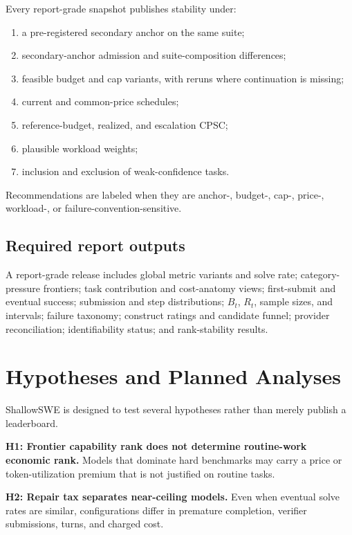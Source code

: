 \documentclass[11pt]{article}
\begin{document}
Every report-grade snapshot publishes stability under:

\begin{enumerate}
\item{} a pre-registered secondary anchor on the same suite;
\item{} secondary-anchor admission and suite-composition differences;
\item{} feasible budget and cap variants, with reruns where continuation is missing;
\item{} current and common-price schedules;
\item{} reference-budget, realized, and escalation CPSC;
\item{} plausible workload weights;
\item{} inclusion and exclusion of weak-confidence tasks.
\end{enumerate}

Recommendations are labeled when they are anchor-, budget-, cap-, price-, workload-, or failure-convention-sensitive.

\subsection{Required report outputs}\hypertarget{115-required-report-outputs}{}\label{115-required-report-outputs}

A report-grade release includes global metric variants and solve rate; category-pressure frontiers; task contribution and cost-anatomy views; first-submit and eventual success; submission and step distributions; $B_t$, $R_t$, sample sizes, and intervals; failure taxonomy; construct ratings and candidate funnel; provider reconciliation; identifiability status; and rank-stability results.

\section{Hypotheses and Planned Analyses}\hypertarget{12-hypotheses-and-planned-analyses}{}\label{12-hypotheses-and-planned-analyses}

ShallowSWE is designed to test several hypotheses rather than merely publish a leaderboard.

\textbf{H1: Frontier capability rank does not determine routine-work economic rank.} Models that dominate hard benchmarks may carry a price or token-utilization premium that is not justified on routine tasks.

\textbf{H2: Repair tax separates near-ceiling models.} Even when eventual solve rates are similar, configurations differ in premature completion, verifier submissions, turns, and charged cost.
\end{document}
